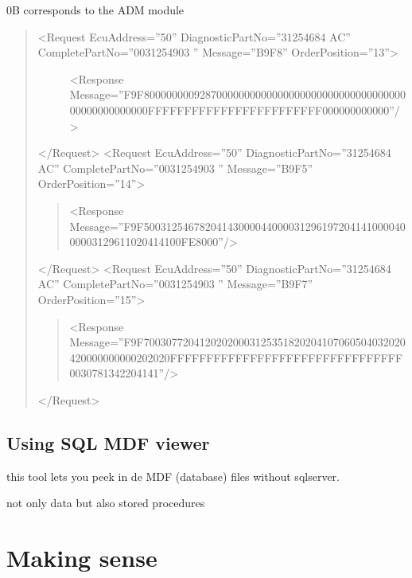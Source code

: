 \documentclass[letterpaper,10pt,english]{sphinxmanual}
\begin{document}
\sphinxAtStartPar
0B corresponds to the ADM module
\begin{quote}
\begin{description}
\item[{\textless{}Request EcuAddress=”50” DiagnosticPartNo=”31254684 AC” CompletePartNo=”0031254903   ” Message=”B9F8” OrderPosition=”13”\textgreater{}}] \leavevmode
\sphinxAtStartPar
\textless{}Response Message=”F9F8000000009287000000000000000000000000000000000000000000000000FFFFFFFFFFFFFFFFFFFFFFFF000000000000”/\textgreater{}

\end{description}

\sphinxAtStartPar
\textless{}/Request\textgreater{}
\textless{}Request EcuAddress=”50” DiagnosticPartNo=”31254684 AC” CompletePartNo=”0031254903   ” Message=”B9F5” OrderPosition=”14”\textgreater{}
\begin{quote}

\sphinxAtStartPar
\textless{}Response Message=”F9F5003125467820414300004400003129619720414100004000003129611020414100FE8000”/\textgreater{}
\end{quote}

\sphinxAtStartPar
\textless{}/Request\textgreater{}
\textless{}Request EcuAddress=”50” DiagnosticPartNo=”31254684 AC” CompletePartNo=”0031254903   ” Message=”B9F7” OrderPosition=”15”\textgreater{}
\begin{quote}

\sphinxAtStartPar
\textless{}Response Message=”F9F70030772041202020003125351820204107060504032020420000000000202020FFFFFFFFFFFFFFFFFFFFFFFFFFFFFFFF0030781342204141”/\textgreater{}
\end{quote}

\sphinxAtStartPar
\textless{}/Request\textgreater{}
\end{quote}


\section{Using SQL MDF viewer}
\label{\detokenize{volvo-diagnostic:using-sql-mdf-viewer}}
\sphinxAtStartPar
this tool lets you peek in de MDF (database) files without sqlserver.

\sphinxAtStartPar
not only data but also stored procedures


\chapter{Making sense}
\label{\detokenize{makingsense/index:making-sense}}\label{\detokenize{makingsense/index::doc}}
\end{document}
